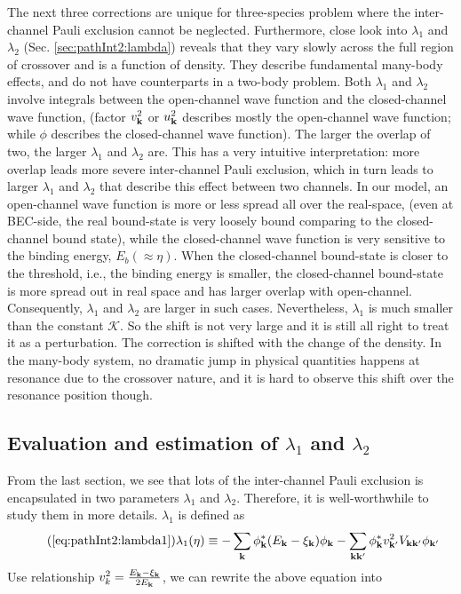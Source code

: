 The next three corrections are unique for three-species problem where the inter-channel Pauli exclusion cannot be neglected.  
Furthermore,  close look into $\lambda_1$ and $\lambda_2$ (Sec. \ref{sec:pathInt2:lambda}) reveals that they vary slowly across the full region of crossover and is a function of density.  They describe  fundamental many-body effects, and do not have counterparts in a two-body problem.  
Both $\lambda_{1}$ and $\lambda_{2}$ involve integrals between the open-channel wave function and the closed-channel wave function, (factor $v_{\mathbf{k}}^{2}$ or $u_{\mathbf{k}}^{2}$ describes mostly the open-channel wave function; while $\phi$ describes the closed-channel wave function). The larger the overlap of two, the larger $\lambda_{1}$ and $\lambda_{2}$ are.  This has a very intuitive interpretation:  more overlap leads more severe inter-channel Pauli exclusion, which in turn leads to larger $\lambda_{1}$ and $\lambda_{2}$ that describe this effect between two  channels.  In our model, an open-channel wave function is more or less spread all over the real-space, (even at BEC-side, the real bound-state is very loosely bound comparing to the closed-channel bound state), while the closed-channel wave function is very sensitive to the binding energy, $E_{b}(\approx\eta)$.  When the closed-channel  bound-state is closer to the threshold, i.e.,  the binding energy  is smaller, the closed-channel bound-state is more spread out  in real space and has larger overlap with open-channel. Consequently,  $\lambda_{1}$ and $\lambda_{2}$ are larger in such cases.                           Nevertheless, $\lambda_1$ is much smaller than the  constant $\mathcal{K}$.  So the shift is not very large and it is still all right to treat it as a perturbation.  The correction is   shifted with the change of the density.  In the many-body system, no dramatic jump in physical quantities happens at resonance due to the crossover nature, and it is hard to observe this shift over the resonance position though.  %


\subsection{Evaluation and estimation of $\lambda_{1}$ and $\lambda_{2}$\label{sec:pathInt2:lambda}}
From the last section, we  see  that lots of the inter-channel Pauli exclusion is encapsulated in two parameters $\lambda_{1}$ and $\lambda_{2}$.   Therefore, it is well-worthwhile to study them in more details.  $\lambda_{1}$ is defined as 
\begin{equation}\tag{\ref{eq:pathInt2:lambda1}}
\lambda_{1}(\eta)\equiv-\sum_{\vk}{\phi_{\vk}^{*}}{(E_{\vk}-\xi_{\vk})}\phi_{\vk}
	-\sum_{\vk\vk'}{\phi_{\vk}^{*}}{v_{\vk'}^{2}V_{\vk\vk'}}\phi_{\vk'}
\end{equation}
Use relationship $v_{k}^{2}=\frac{E_{\mathbf{k}}-\xi_{\mathbf{k}}}{2E_{\mathbf{k}}}$, we can rewrite the above equation into 

